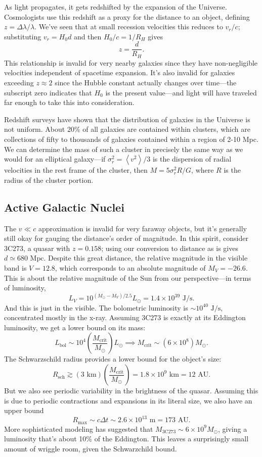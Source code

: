 \documentclass[../a062main.tex]{subfiles}
\begin{document}
As light propagates, it gets redshifted by the expansion of the Universe.
Cosmologists use this redshift as a proxy for the distance to an object, defining $z = \Delta \lambda / \lambda$.
We've seen that at small recession velocities this reduces to $v_r / c$; substituting $v_r = H_0d$ and then $H_0 / c = 1 / R_H$ gives
\[ z = \frac{d}{R_H}. \]
This relationship is invalid for very nearby galaxies since they have non-negligible velocities independent of spacetime expansion.
It's also invalid for galaxies exceeding $z \approx 2$ since the Hubble constant actually changes over time---the subscript zero indicates that $H_0$ is the present value---and light will have traveled far enough to take this into consideration.

Redshift surveys have shown that the distribution of galaxies in the Universe is not uniform.
About 20\% of all galaxies are contained within clusters, which are collections of fifty to thousands of galaxies contained within a region of 2-10 Mpc.
We can determine the mass of such a cluster in precisely the same way as we would for an elliptical galaxy---if $\sigma_r^2 = \left< v^2 \right> / 3$ is the dispersion of radial velocities in the rest frame of the cluster, then $M = 5 \sigma_r^2 R / G$, where $R$ is the radius of the cluster portion.


\subsection*{Active Galactic Nuclei}
The $v \ll c$ approximation is invalid for very faraway objects, but it's generally still okay for gauging the distance's order of magnitude.
In this spirit, consider 3C273, a quasar with $z = 0.158$; using our conversion to distance as is gives $d \simeq 680 \textrm{ Mpc}$.
Despite this great distance, the relative magnitude in the visible band is $V = 12.8$, which corresponds to an absolute magnitude of $M_V = -26.6$.
This is about the relative magnitude of the Sun from our perspective---in terms of luminosity,
\[ L_V = 10^{(M_\odot - M_V) / 2.5} L_\odot = 1.4 \times 10^{39} \textrm{ J/s}. \]
And this is just in the visible.
The bolometric luminosity is $\sim 10^{40} \textrm{ J/s}$, concentrated mostly in the x-ray.
Assuming 3C273 is exactly at its Eddington luminosity, we get a lower bound on its mass:
\[ L_\textrm{bol} \sim 10^{4} \left( \frac{M_\textrm{crit}}{M_\odot} \right) L_\odot \implies M_\textrm{crit} \sim (6 \times 10^{8}) M_\odot. \]
The Schwarzschild radius provides a lower bound for the object's size:
\[ R_\textrm{sch} \gtrsim (3 \textrm{ km}) \left( \frac{M_\textrm{crit}}{M_\odot} \right) = 1.8 \times 10^{9} \textrm{ km} = 12 \textrm{ AU}. \]
But we also see periodic variability in the brightness of the quasar.
Assuming this is due to periodic contractions and expansions in its literal size, we also have an upper bound
\[ R_\textrm{max} \sim c \Delta t \sim 2.6 \times 10^{13} \textrm{ m} = 173 \textrm{ AU}. \]
More sophisticated modeling has suggested that $M_\textrm{3C273} \sim 6 \times 10^{9} M_\odot$, giving a luminosity that's about 10\% of the Eddington.
This leaves a surprisingly small amount of wriggle room, given the Schwarzchild bound.
\end{document}
